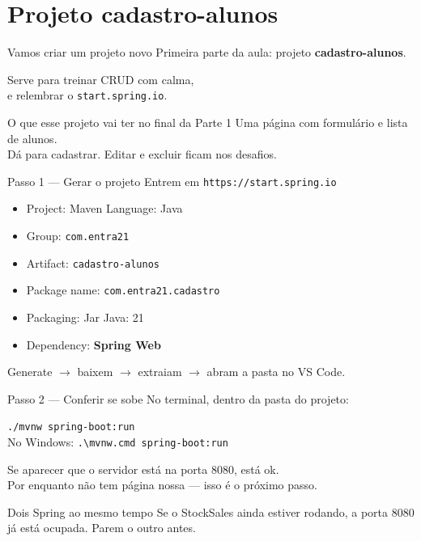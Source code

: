 \documentclass[aspectratio=169,11pt]{beamer}
\begin{document}
\section{Projeto cadastro-alunos}

\begin{frame}{Vamos criar um projeto novo}
  Primeira parte da aula: projeto \textbf{cadastro-alunos}.

  \vspace{0.5em}
  Serve para treinar CRUD com calma,\\
  e relembrar o \texttt{start.spring.io}.

  \vspace{0.6em}
  \begin{block}{O que esse projeto vai ter no final da Parte 1}
    Uma página com formulário e lista de alunos.\\
    Dá para cadastrar. Editar e excluir ficam nos desafios.
  \end{block}
\end{frame}

\begin{frame}{Passo 1 --- Gerar o projeto}
  Entrem em \texttt{https://start.spring.io}

  \vspace{0.4em}
  \begin{itemize}
    \item Project: Maven \quad Language: Java
    \item Group: \texttt{com.entra21}
    \item Artifact: \texttt{cadastro-alunos}
    \item Package name: \texttt{com.entra21.cadastro}
    \item Packaging: Jar \quad Java: 21
    \item Dependency: \textbf{Spring Web}
  \end{itemize}

  \vspace{0.4em}
  Generate $\rightarrow$ baixem $\rightarrow$ extraiam $\rightarrow$ abram a pasta
  no VS Code.
\end{frame}

\begin{frame}{Passo 2 --- Conferir se sobe}
  No terminal, dentro da pasta do projeto:

  \vspace{0.4em}
  \texttt{./mvnw spring-boot:run}\\
  {\small No Windows: \texttt{.\textbackslash mvnw.cmd spring-boot:run}}

  \vspace{0.5em}
  Se aparecer que o servidor está na porta 8080, está ok.\\
  Por enquanto não tem página nossa --- isso é o próximo passo.

  \vspace{0.5em}
  \begin{alertblock}{Dois Spring ao mesmo tempo}
    Se o StockSales ainda estiver rodando, a porta 8080
    já está ocupada. Parem o outro antes.
  \end{alertblock}
\end{frame}
\end{document}
